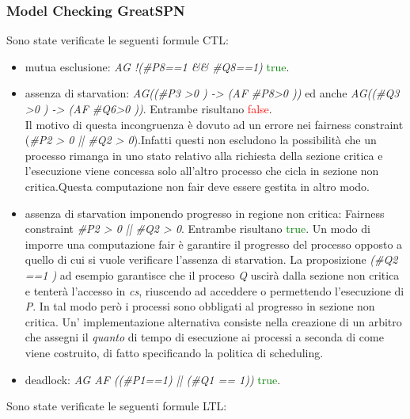\documentclass[a4paper]{article}
\begin{document}
\subsubsection{Model Checking GreatSPN}
Sono state verificate le seguenti formule CTL:
\begin{itemize}
	\item mutua esclusione: \textit{AG !(\#P8==1 \&\& \#Q8==1)} \textcolor{green}{true}.
	\item assenza di starvation: \textit{AG((\#P3 >0 ) -> (AF \#P8>0 ))} ed anche \textit{AG((\#Q3 >0 ) -> (AF \#Q6>0 ))}. Entrambe risultano \textcolor{red}{false}.\\
		Il motivo di questa incongruenza è dovuto ad un errore nei fairness constraint (\textit{\#P2 > 0 || \#Q2 > 0}).Infatti questi non escludono la possibilità che un processo rimanga in uno stato relativo alla richiesta della sezione critica e l'esecuzione viene concessa solo all'altro processo che cicla in sezione non critica.Questa computazione non fair deve essere gestita in altro modo.
	\item assenza di starvation imponendo progresso in regione non critica: Fairness constraint \textit{\#P2 > 0 || \#Q2 > 0}. Entrambe risultano \textcolor{green}{true}.
		Un modo di imporre una computazione fair è garantire il progresso del processo opposto a quello di cui si vuole verificare l'assenza di starvation. La proposizione \textit{(\#Q2 ==1 )} ad esempio garantisce che il proceso \textit{Q} uscirà dalla sezione non critica e tenterà l'accesso in \textit{cs}, riuscendo ad acceddere o permettendo l'esecuzione di \textit{P}. In tal modo però i processi sono obbligati al progresso in sezione non critica.
		Un' implementazione alternativa consiste nella creazione di un arbitro che assegni il \textit{quanto} di tempo di esecuzione ai processi a seconda di come viene costruito, di fatto specificando la politica di scheduling.
	\item deadlock: \textit{AG AF ((\#P1==1) || (\#Q1 == 1))} \textcolor{green}{true}.
\end{itemize}
Sono state verificate le seguenti formule LTL:
\end{document}
